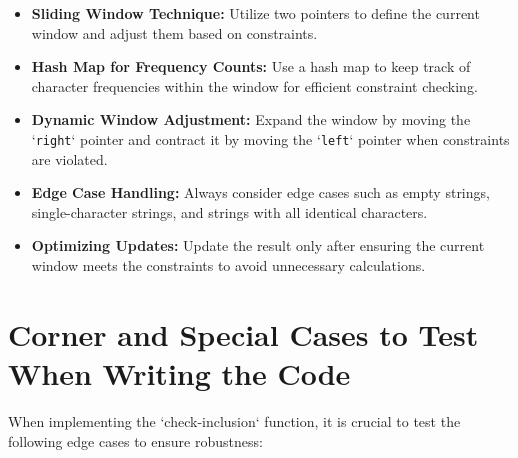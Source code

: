 \begin{itemize}
    \item \textbf{Sliding Window Technique:} Utilize two pointers to define the current window and adjust them based on constraints.
    
    \item \textbf{Hash Map for Frequency Counts:} Use a hash map to keep track of character frequencies within the window for efficient constraint checking.
    
    \item \textbf{Dynamic Window Adjustment:} Expand the window by moving the `\texttt{right}` pointer and contract it by moving the `\texttt{left}` pointer when constraints are violated.
    
    \item \textbf{Edge Case Handling:} Always consider edge cases such as empty strings, single-character strings, and strings with all identical characters.
    
    \item \textbf{Optimizing Updates:} Update the result only after ensuring the current window meets the constraints to avoid unnecessary calculations.
\end{itemize}

\section*{Corner and Special Cases to Test When Writing the Code}

When implementing the `check-inclusion` function, it is crucial to test the following edge cases to ensure robustness:

